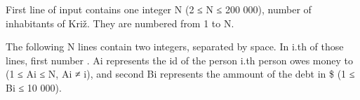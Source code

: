 First line of input contains one integer N (2 ≤ N ≤ 200 000), number of inhabitants of Križ. They are numbered from 1 to N.  

   The following N lines contain two integers, separated by space. In i.th of those lines, first number . Ai represents the id of the person  i.th person owes money to (1 ≤  Ai  ≤ N,  Ai  ≠  i), and second  Bi represents the ammount of the debt in \$ (1 ≤ Bi  ≤ 10 000).  

\